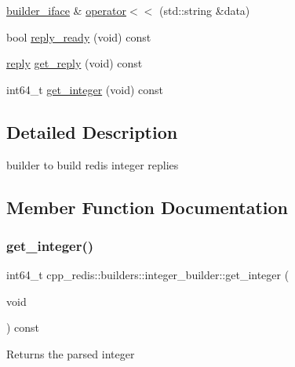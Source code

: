 \begin{DoxyCompactItemize}
\mbox{\hyperlink{classcpp__redis_1_1builders_1_1builder__iface}{builder\+\_\+iface}} \& \mbox{\hyperlink{classcpp__redis_1_1builders_1_1integer__builder_ae29f074134f7269db7f947b0fcbe312e}{operator$<$$<$}} (std\+::string \&data)
\item 
bool \mbox{\hyperlink{classcpp__redis_1_1builders_1_1integer__builder_a4893dc36d06d75094bb4fe3fbc826966}{reply\+\_\+ready}} (void) const
\item 
\mbox{\hyperlink{classcpp__redis_1_1reply}{reply}} \mbox{\hyperlink{classcpp__redis_1_1builders_1_1integer__builder_a25221763ba6f8b740458c673945208e0}{get\+\_\+reply}} (void) const
\item 
int64\+\_\+t \mbox{\hyperlink{classcpp__redis_1_1builders_1_1integer__builder_af68431c4c81242c1930b3b4feb2028e5}{get\+\_\+integer}} (void) const
\end{DoxyCompactItemize}


\subsection{Detailed Description}
builder to build redis integer replies 

\subsection{Member Function Documentation}
\mbox{\label{classcpp__redis_1_1builders_1_1integer__builder_af68431c4c81242c1930b3b4feb2028e5}} 
\subsubsection{\texorpdfstring{get\+\_\+integer()}{get\_integer()}}
{\footnotesize\ttfamily int64\+\_\+t cpp\+\_\+redis\+::builders\+::integer\+\_\+builder\+::get\+\_\+integer (\begin{DoxyParamCaption}\item[{void}]{ }\end{DoxyParamCaption}) const}

\begin{DoxyReturn}{Returns}
the parsed integer 
\end{DoxyReturn}
\mbox{\label{classcpp__redis_1_1builders_1_1integer__builder_a25221763ba6f8b740458c673945208e0}} 
